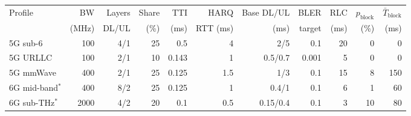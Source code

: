 \begin{tabular}{@{}lrrrrrrrrrr@{}}
\toprule
Profile & BW & Layers & Share & TTI & HARQ & Base DL/UL & BLER & RLC & $p_\text{block}$ & $\bar{T}_\text{block}$ \\
 & (MHz) & DL/UL & (\%) & (ms) & RTT (ms) & (ms) & target & (ms) & (\%) & (ms) \\
\midrule
5G sub-6 & 100 & 4/1 & 25 & 0.5 & 4 & 2/5 & 0.1 & 20 & 0 & 0 \\
5G URLLC & 100 & 2/1 & 10 & 0.143 & 1 & 0.5/0.7 & 0.001 & 5 & 0 & 0 \\
5G mmWave & 400 & 2/1 & 25 & 0.125 & 1.5 & 1/3 & 0.1 & 15 & 8 & 150 \\
6G mid-band$^\ast$ & 400 & 8/2 & 25 & 0.125 & 1 & 0.4/1 & 0.1 & 6 & 1 & 60 \\
6G sub-THz$^\ast$ & 2000 & 4/2 & 20 & 0.1 & 0.5 & 0.15/0.4 & 0.1 & 3 & 10 & 80 \\
\bottomrule
\end{tabular}
